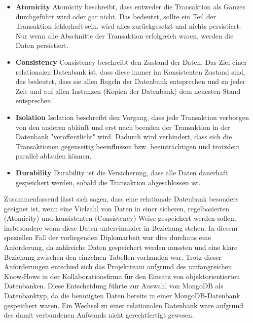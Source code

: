 \begin{itemize}
    \item \textbf{Atomicity}
        \newline
        Atomicity beschreibt, dass entweder die Transaktion als Ganzes durchgeführt wird oder gar nicht. Das bedeutet, sollte ein Teil der Transaktion fehlerhaft sein, wird alles zurückgesetzt und nichts persistiert. Nur wenn alle Abschnitte der Transaktion erfolgreich waren, werden die Daten persistiert.
    \item \textbf{Consistency}
        \newline
       Consistency beschreibt den Zustand der Daten. Das Ziel einer relationalen Datenbank ist, dass diese immer im Konsistenten Zustand sind, das bedeutet, dass sie allen Regeln der Datenbank entsprechen und zu jeder Zeit und auf allen Instanzen (Kopien der Datenbank) dem neuesten Stand entsprechen.
    \item \textbf{Isolation}
        \newline
        Isolation beschreibt den Vorgang, dass jede Transaktion verborgen von den anderen abläuft und erst nach beenden der Transaktion in der Datenbank "veröffentlicht" wird. Dadurch wird verhindert, dass sich die Transaktionen gegenseitig beeinflussen bzw. beeinträchtigen und trotzdem parallel ablaufen können.
    \item \textbf{Durability}
        \newline
        Durability ist die Versicherung, dass alle Daten dauerhaft gespeichert werden, sobald die Transaktion abgeschlossen ist.
\end{itemize}
Zusammenfassend lässt sich sagen, dass eine relationale Datenbank besonders geeignet ist, wenn eine Vielzahl von Daten in einer sicheren, regelbasierten (Atomicity) und konsistenten (Consistency) Weise gespeichert werden sollen, insbesondere wenn diese Daten untereinander in Beziehung stehen. In diesem speziellen Fall der vorliegenden Diplomarbeit war dies durchaus eine Anforderung, da zahlreiche Daten gespeichert werden mussten und eine klare Beziehung zwischen den einzelnen Tabellen vorhanden war.
\newline
Trotz dieser Anforderungen entschied sich das Projektteam aufgrund des umfangreichen Know-Hows in der Kollaborationsfirma für den Einsatz von objektorientierten Datenbanken. Diese Entscheidung führte zur Auswahl von MongoDB als Datenbanktyp, da die benötigten Daten bereits in einer MongoDB-Datenbank gespeichert waren. Ein Wechsel zu einer relationalen Datenbank wäre aufgrund des damit verbundenen Aufwands nicht gerechtfertigt gewesen.
